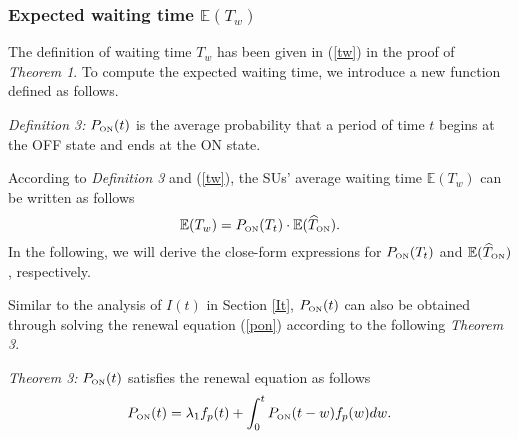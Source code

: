 \documentclass[11pt,draftcls]{IEEEtran}{\onecolumn}
\begin{document}
\subsubsection{Expected waiting time $\mathbb{E}(T_w)$}
The definition of waiting time $T_w$ has been given in (\ref{tw}) in
the proof of \emph{Theorem 1}. To compute the expected waiting time,
we introduce a new function defined as follows.

\emph{Definition 3:} $P_{\mbox{\tiny{ON}}}(t)$ is the average
probability that a period of time $t$ begins at the OFF state and
ends at the ON state.

According to \emph{Definition 3} and (\ref{tw}), the SUs' average
waiting time $\mathbb{E}(T_w)$ can be written as follows
\begin{equation}
\mathbb{E}(T_w)=P_{\mbox{\tiny{ON}}}(T_t)\cdot\mathbb{E}(\widehat{T}_{\mbox{\tiny{ON}}}).
\end{equation}
In the following, we will derive the close-form expressions for
$P_{\mbox{\tiny{ON}}}(T_t)$ and
$\mathbb{E}(\widehat{T}_{\mbox{\tiny{ON}}})$, respectively.

Similar to the analysis of $I(t)$ in Section \ref{It},
$P_{\mbox{\tiny{ON}}}(t)$ can also be obtained through solving the
renewal equation (\ref{pon}) according to the following
\emph{Theorem 3}.

\emph{Theorem 3:} $P_{\mbox{\tiny{ON}}}(t)$ satisfies the renewal
equation as follows
\begin{equation}\label{pon}
P_{\mbox{\tiny{ON}}}(t)=\lambda_1f_p(t)+\int_{0}^{t}P_{\mbox{\tiny{ON}}}(t-w)f_p(w)dw.
\end{equation}
\end{document}
